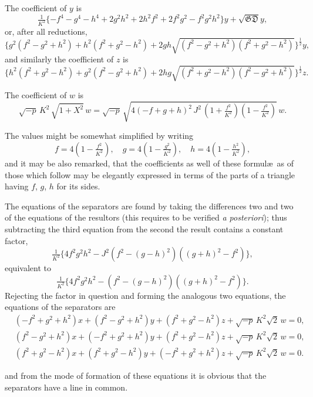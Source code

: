 \documentclass[11pt]{article}
\begin{document}
The coefficient of $y$ is
\[
\tfrac{1}{K^2}\{-f^4-g^4-h^4+2g^2h^2+2h^2f^2+2f^2g^2-f^2g^2h^2\}y + \sqrt{\mathfrak{G}\mathfrak{D}}y,
\]
or, after all reductions,
\[
\{g^2(f^2-g^2+h^2)+h^2(f^2+g^2-h^2)+2gh\sqrt{(f^2-g^2+h^2)(f^2+g^2-h^2)}\}^{\frac{1}{2}}y,
\]
and similarly the coefficient of $z$ is
\[
\{h^2(f^2+g^2-h^2)+g^2(f^2-g^2+h^2)+2hg\sqrt{(f^2+g^2-h^2)(f^2-g^2+h^2)}\}^{\frac{1}{2}}z.
\]

The coefficient of $w$ is
\[
\sqrt{-p}\,K^2\,\sqrt{1+X^2}\,w = \sqrt{-p}\,\sqrt{4(-f+g+h)^2\,J^2\,(1+\tfrac{f^2}{K^2})(1-\tfrac{f^2}{K^2})}\,w.
\]

The values might be somewhat simplified by writing
\[
f = 4(1-\tfrac{f^2}{K^2}), \quad g = 4(1-\tfrac{g^2}{K^2}), \quad h = 4(1-\tfrac{h^2}{K^2}),
\]
and it may be also remarked, that the coefficients as well of these formul\ae\ as of those which follow may be elegantly expressed in terms of the parts of a triangle having $f$, $g$, $h$ for its sides.

The equations of the separators are found by taking the differences two and two of the equations of the resultors (this requires to be verified \textit{a posteriori}); thus subtracting the third equation from the second the result contains a constant factor,
\[
\tfrac{1}{K^2}\{4f^2g^2h^2-J^2(f^2-(g-h)^2)((g+h)^2-f^2)\},
\]
equivalent to
\[
\tfrac{1}{K^2}\{4f^2g^2h^2-(f^2-(g-h)^2)((g+h)^2-f^2)\}.
\]
Rejecting the factor in question and forming the analogous two equations, the equations of the separators are
\begin{align*}
&(-f^2+g^2+h^2)x + (f^2-g^2+h^2)y + (f^2+g^2-h^2)z + \sqrt{-p}\,K^2\sqrt{2}\,w = 0,\\
&(f^2-g^2+h^2)x + (-f^2+g^2+h^2)y + (f^2+g^2-h^2)z + \sqrt{-p}\,K^2\sqrt{2}\,w = 0,\\
&(f^2+g^2-h^2)x + (f^2+g^2-h^2)y + (-f^2+g^2+h^2)z + \sqrt{-p}\,K^2\sqrt{2}\,w = 0.
\end{align*}

\newpage
\setcounter{page}{81}

and from the mode of formation of these equations it is obvious that the separators have a line in common.
\end{document}
